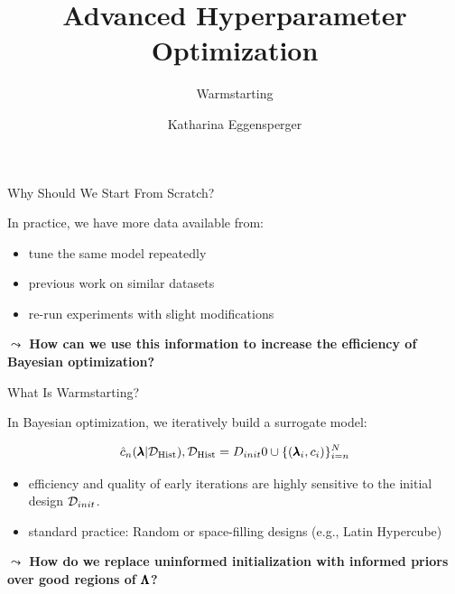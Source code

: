 \documentclass[main]{subfiles}
\title[Advanced Hyperparameter Optimization]{Advanced Hyperparameter Optimization}
\subtitle{Warmstarting}
\author[Katharina Eggensperger]{Katharina Eggensperger}
\date{}
\begin{document}
	
	\maketitle
	

\begin{frame}[c]{Why Should We Start From Scratch?}

In practice, we have more data available from:
\begin{itemize}
    \item tune the same model repeatedly
    \item previous work on similar datasets
    \item re-run experiments with slight modifications
\end{itemize}

\vspace{1cm}
\textbf{$\leadsto$ How can we use this information to increase the efficiency of Bayesian optimization?} \\

\end{frame}
\begin{frame}[c]{What Is Warmstarting?}

In Bayesian optimization, we iteratively build a surrogate model: 

\begin{equation*}
    \hat{c}_n (\pmb{\lambda} | \mathcal{D}_{\text{Hist}}), \mathcal{D}_{\text{Hist}} = D_{init}0 \cup \{(\pmb{\lambda}_i, c_i)\}_{i=n}^N
\end{equation*}

\begin{itemize}
    \item efficiency and quality of early iterations are highly sensitive to the initial design $\mathcal{D}_{init}$.
    \item standard practice: Random or space-filling designs (e.g., Latin Hypercube)
\end{itemize}

\vspace{1cm}
\textbf{$\leadsto$ How do we replace uninformed initialization with informed priors over good regions of $\pmb{\Lambda}$?}

\end{frame}
\end{document}
